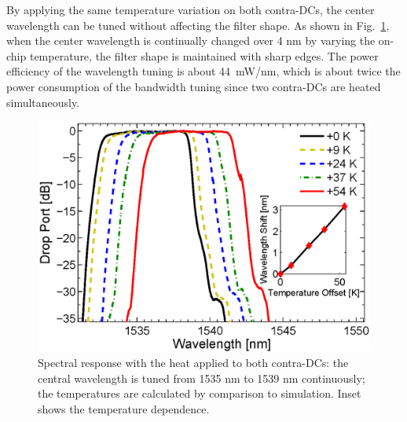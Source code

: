 \documentclass[9pt,twocolumn,twoside]{osajnl}
\begin{document}
	By applying the same temperature variation on both contra-DCs, the center wavelength can be tuned without affecting the filter shape.
	As shown in Fig.~\ref{fig:wavTune}, when the center wavelength is continually changed over 4 nm by varying the on-chip temperature, the filter shape is maintained with sharp edges. 
	The power efficiency of the wavelength tuning is about 44~mW/nm, which is about twice the power consumption of the bandwidth tuning since two contra-DCs are heated simultaneously.
	\begin{figure}[htbp]
		\centering
		\includegraphics[width=.99\columnwidth]{data/Central2}
		\caption{Spectral response with the heat applied to both contra-DCs: the central wavelength is tuned from 1535 nm to 1539 nm continuously; the temperatures are calculated by comparison to simulation. Inset shows the temperature dependence.}
		\label{fig:wavTune}
	\end{figure} 
	
	
	
	
	
	
	
\end{document}
